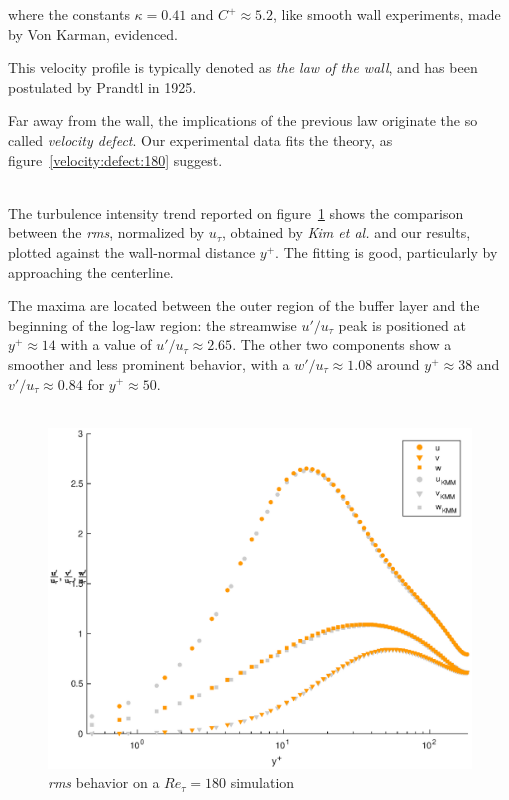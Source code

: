 where the constants $\kappa=0.41$ and $C^{+}\approx 5.2$, like smooth wall experiments, made by Von Karman, evidenced. \par
This velocity profile is typically denoted as \emph{the law of the wall}, and has been postulated by Prandtl in 1925.\par
Far away from the wall, the implications of the previous law originate the so called \emph{velocity defect}.
Our experimental data fits the theory, as figure~\ref{velocity:defect:180} suggest.\\~\par

The turbulence intensity trend reported on figure~\ref{rms:kmm:180} shows the comparison between the \emph{rms}, normalized by $u_{\tau}$, obtained by \emph{Kim et al.} and our results, plotted against the wall-normal distance $y^{+}$. 
The fitting is good, particularly by approaching the centerline.\par

The maxima are located between the outer region of the buffer layer and the beginning of the log-law region: the streamwise $u'/u_{\tau}$ peak is positioned at $y^{+} \approx 14$ with a value of $u'/u_{\tau} \approx 2.65$. The other two components show a smoother and less prominent behavior, with a $w'/u_{\tau} \approx 1.08$ around $y^{+} \approx 38$ and $v'/u_{\tau} \approx 0.84$ for $y^{+} \approx 50$. \\~\par

\begin{figure}
\begin{center}
\includegraphics[scale=0.55]{grafici/rms_kmm.eps}
\caption{\emph{rms} behavior on a $Re_{\tau}=180$ simulation}
\label{rms:kmm:180}
\end{center} 
\end{figure}


